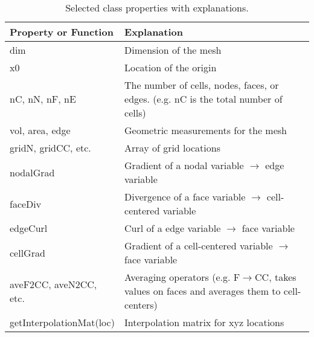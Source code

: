 \begin{table}[ht]
\caption{Selected \Mesh class properties with explanations.}
\label{table:Mesh}
  \begin{tabular}{  p{4cm}  p{9.5cm} }
    \hline

    Property or Function & Explanation \\ \hline
    dim  & Dimension of the mesh\\
    x0  & Location of the origin\\
    nC, nN, nF, nE & The number of cells, nodes, faces, or edges. (e.g. nC is the total number of cells)\\
    vol, area, edge  & Geometric measurements for the mesh\\ %
    gridN, gridCC, etc.  & Array of grid locations\\
    nodalGrad  &  Gradient of a nodal variable $\rightarrow$ edge variable\\
    faceDiv  & Divergence of a face variable $\rightarrow$ cell-centered variable\\
    edgeCurl  & Curl of a edge variable $\rightarrow$ face variable\\
    cellGrad  & Gradient of a cell-centered variable $\rightarrow$ face variable\\
    aveF2CC, aveN2CC, etc.  & Averaging operators (e.g. F$\rightarrow$CC, takes values on faces and averages them to cell-centers)\\
    getInterpolationMat(loc)  & Interpolation matrix for xyz locations\\

    \hline
  \end{tabular}
\end{table}
